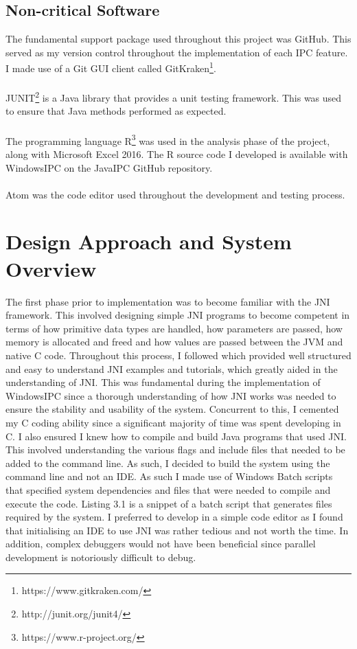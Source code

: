\documentclass[12pt] {newrucsthesis}    %
\begin{document}
        \subsection{Non-critical Software}
          The fundamental support package used throughout this project was GitHub. This served
          as my version control throughout the implementation of each IPC feature. I made use
          of a Git GUI client called GitKraken\footnote{https://www.gitkraken.com/}.
          \\\\
          JUNIT\footnote{http://junit.org/junit4/} is a Java library that provides a unit testing framework. This
          was used to ensure that Java methods performed as expected.
          \\\\
          The programming language R\footnote{https://www.r-project.org/} was used in the analysis phase of the project, along with Microsoft Excel 2016.
          The R source code I developed is available with WindowsIPC on the JavaIPC GitHub repository.
          \\\\
          Atom was the code editor used throughout the development and testing process.

    \section{Design Approach and System Overview} \label{devapproach}
      The first phase prior to implementation was to become familiar with
      the JNI framework. This involved designing simple JNI programs to become competent
      in terms of how primitive data types are handled, how parameters are passed, how memory is
      allocated and freed and how values are passed between the JVM and native C code. Throughout this process,
      I followed \cite{LiangJNISpecification} which provided well structured and easy to understand
      JNI examples and tutorials, which greatly aided in the understanding of JNI. This was fundamental
      during the implementation of WindowsIPC since a thorough understanding of how JNI works was needed
      to ensure the stability and usability of the system. Concurrent to this, I cemented my C coding ability since
      a significant majority of time was spent developing in C. I also ensured I knew how to compile and build Java programs
      that used JNI. This involved understanding the various flags and include files that needed to be added to the command line.
      As such, I decided to build the system using the command line and not an IDE. As such I made use of Windows Batch scripts that
      specified system dependencies and files that were needed to compile and execute the code. Listing 3.1 is a
      snippet of a batch script that generates files required by the system. I preferred to develop in a
      simple code editor as I found that initialising an IDE to use JNI was rather tedious and not worth the time. In addition,
      complex debuggers would not have been beneficial since parallel development is notoriously difficult to debug.
\end{document}
